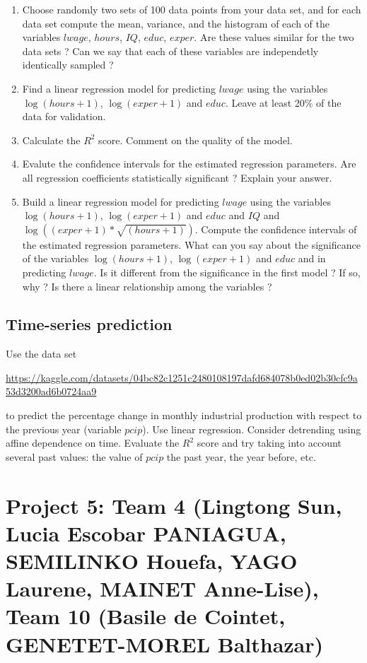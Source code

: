 \documentclass{article}
\begin{document}
  \begin{enumerate}
	 \item Choose randomly two sets of 100 data points from your data set, and for each data set compute the mean, variance, and the histogram
		 of each of the variables  $lwage$, $hours$, $IQ$,  $educ$, $exper$. 
	Are these values similar for the two data sets ?  Can we say that each of these variables are independetly identically sampled ? 
\item Find a linear regression model for predicting $lwage$ using the variables $\log(hours+1)$, $\log(exper+1)$ and $educ$. 
   Leave at least 20\% of the data for validation. 
  \item Calculate the $R^2$ score. Comment on the quality of the model.
  \item Evalute the confidence intervals for the estimated regression parameters. Are all regression coefficients statistically significant ? Explain your answer.
  \item Build a linear regression model  for predicting $lwage$ using the variables $\log(hours+1)$, $\log(exper+1)$ and $educ$ and $IQ$
	  and $\log((exper+1)*\sqrt{(hours+1)})$. Compute the confidence intervals of the estimated regression parameters.
	What can you say about the significance of the variables $\log(hours+1)$, $\log(exper+1)$ and $educ$ and 
	in predicting $lwage$.
	Is it different from the significance in the first model ? If so, why ? Is there a linear relationship among the variables ? 

 \end{enumerate}


   
 \subsection*{Time-series prediction}
    Use the data set 

    \url{https://kaggle.com/datasets/04bc82c1251c2480108197dafd684078b0ed02b30cfc9a53d3200ad6b0724aa9} 

    to predict the percentage change in monthly
    industrial production with respect to the previous year (variable $pcip$). Use linear regression.
   Consider detrending using affine  dependence on time.  
   Evaluate the $R^2$ score and try taking into account several past values: the value of $pcip$ the past year, the year before, etc. 


\section*{Project 5: Team 4 (Lingtong Sun,  Lucia Escobar PANIAGUA, SEMILINKO Houefa, YAGO Laurene, MAINET Anne-Lise), Team 10 (Basile de Cointet, GENETET-MOREL Balthazar)}
 
\end{document}

